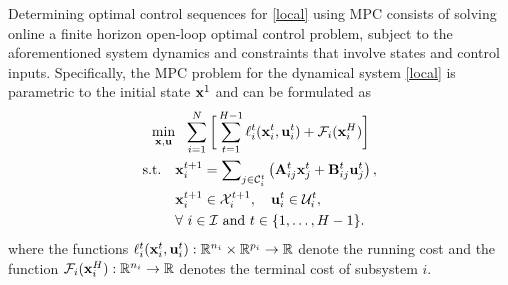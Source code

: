 \documentclass[doublecolumn]{IEEEtran}
\begin{document}
Determining optimal control sequences for \eqref{local} using MPC consists of  solving online a finite horizon open-loop optimal control problem, subject to the aforementioned system dynamics and constraints that involve states and control inputs.
Specifically,  the MPC problem for the dynamical system \eqref{local} is parametric to the initial state ${ {\bf x} }^1$ and can be formulated as
\begin{align}\label{DMPC1}
\min_{{ {\bf x} },{\mathbf{u}}} &	~~\sum_{i=1}^N \bigg[ \sum_{t=1}^{H-1} \ell^t_i({ {\bf x} }_i^t,{\mathbf{u}}_i^t) + { \mathcal{F} }_i({ {\bf x} }_i^{H}) \bigg] \nonumber\\
\text{s.t.} \quad &{ {\bf x} }_i^{t+1} = {\sum\nolimits}_{j\in{\mathcal{C}}_i^t} \left({ {\bf A} }_{ij}^t { {\bf x} }_j^t + {\mathbf{B}}_{ij}^t {\mathbf{u}}_j^t \right),	\\
&{ {\bf x} }_i^{t+1}\in{ \mathcal{X} }_i^{t+1}, \quad {\mathbf{u}}_i^t\in{\mathcal{U}}_i^{t},\nonumber\\
& \forall ~i\in{ \mathcal{I} } ~\text{and} ~t\in\{1,\dots,H-1\}.  \nonumber
\end{align}
where the functions  $\ell^t_i({ {\bf x} }_i^t,{\mathbf{u}}_i^t): {\mathbb R}^{n_i} \times {\mathbb R}^{p_i} \to {\mathbb R}$ denote the running cost and the function ${ \mathcal{F} }_i({ {\bf x} }_i^H): {\mathbb R}^{n_i}\to {\mathbb R}$ denotes the terminal cost of subsystem $i$.
\end{document}
